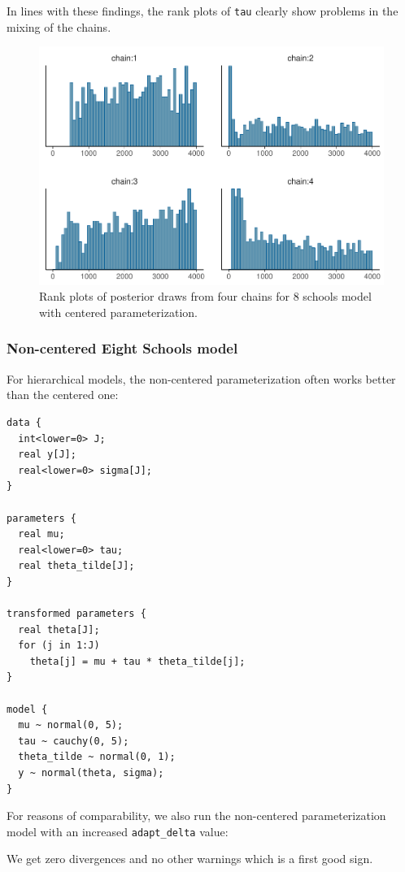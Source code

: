 \documentclass[american,]{article}
\begin{document}
In lines with these findings, the rank plots of \texttt{tau} clearly
show problems in the mixing of the chains.

\begin{figure}[t]
  \centering
  \includegraphics[width=0.6\linewidth]{graphics/hist-fit-cp-1.pdf}
  \caption{Rank plots of posterior draws from four chains for 8 schools model with centered parameterization.}
\end{figure}

\FloatBarrier

\hypertarget{non-centered-eight-schools-model}{%
\subsubsection{Non-centered Eight Schools
model}\label{non-centered-eight-schools-model}}

For hierarchical models, the non-centered parameterization often works
better than the centered one:

\begin{verbatim}
data {
  int<lower=0> J;
  real y[J];
  real<lower=0> sigma[J];
}

parameters {
  real mu;
  real<lower=0> tau;
  real theta_tilde[J];
}

transformed parameters {
  real theta[J];
  for (j in 1:J)
    theta[j] = mu + tau * theta_tilde[j];
}

model {
  mu ~ normal(0, 5);
  tau ~ cauchy(0, 5);
  theta_tilde ~ normal(0, 1);
  y ~ normal(theta, sigma);
}
\end{verbatim}

For reasons of comparability, we also run the non-centered
parameterization model with an increased \texttt{adapt\_delta} value:

We get zero divergences and no other warnings which is a first good
sign.
\end{document}
